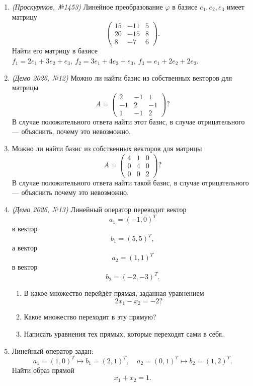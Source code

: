 \begin{enumerate}
    \item \textit{(Проскуряков, №1453)} Линейное преобразование $\varphi$ в базисе $e_1, e_2, e_3$ имеет матрицу
    \[
    \begin{pmatrix}
    15 & -11 & 5 \\
    20 & -15 & 8 \\
     8 &  -7 & 6
    \end{pmatrix}.
    \]
    Найти его матрицу в базисе $f_1 = 2e_1 + 3e_2 + e_3, \ f_2 = 3e_1 + 4e_2 + e_3, \ f_3 = e_1 + 2e_2 + 2e_3$.


    \item \textit{(Демо 2026, №12)}
    Можно ли найти базис из собственных векторов для матрицы
    \[
    A=\begin{pmatrix}
    2 & -1 & 1\\
    -1 & 2 & -1\\
    1 & -1 & 2
    \end{pmatrix}?
    \]
    В случае положительного ответа найти этот базис, в случае отрицательного --- объяснить, почему это невозможно.

    \item
    Можно ли найти базис из собственных векторов для матрицы
    \[
    A=\begin{pmatrix}
    4 & 1 & 0 \\
    0 & 4 & 0 \\
    0 & 0 & 2
    \end{pmatrix}?
    \]
    В случае положительного ответа найти такой базис, в случае отрицательного --- объяснить почему это невозможно.

    \item \textit{(Демо 2026, №13)}
    Линейный оператор переводит вектор
    \[
    a_1=(-1,0)^T
    \]
    в вектор
    \[
    b_1=(5,5)^T,
    \]
    а вектор
    \[
    a_2=(1,1)^T
    \]
    в вектор
    \[
    b_2=(-2,-3)^T.
    \]
    \begin{enumerate}
        \item[1)] В какое множество перейдёт прямая, заданная уравнением
        \[
        2x_1-x_2=-2?
        \]
        \item[2)] Какое множество переходит в эту прямую?
        \item[3)] Написать уравнения тех прямых, которые переходят сами в себя.
    \end{enumerate}

    \item Линейный оператор задан:
    \[
    a_1=(1,0)^T \mapsto b_1=(2,1)^T,\quad
    a_2=(0,1)^T \mapsto b_2=(1,2)^T.
    \]
    Найти образ прямой
    \[
    x_1 + x_2 = 1.
    \]


\end{enumerate}
